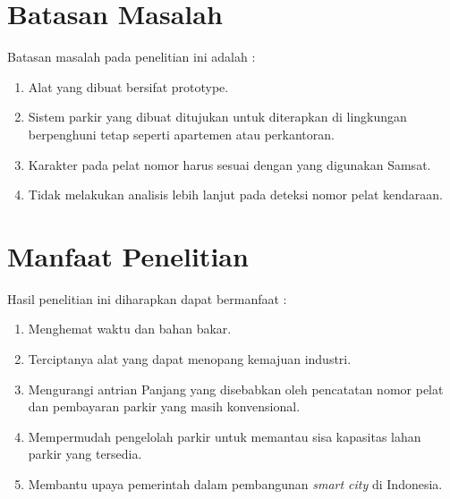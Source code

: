 \section{Batasan Masalah}
Batasan masalah pada penelitian ini adalah :
\begin{enumerate}[topsep=0pt,itemsep=0pt,partopsep=0pt, parsep=0pt]
    \item Alat yang dibuat bersifat prototype.
    \item Sistem parkir yang dibuat ditujukan untuk diterapkan di lingkungan berpenghuni tetap seperti apartemen atau perkantoran.
    \item Karakter pada pelat nomor harus sesuai dengan yang digunakan Samsat.
    \item Tidak melakukan analisis lebih lanjut pada deteksi nomor pelat kendaraan.
\end{enumerate}

\section{Manfaat Penelitian}
Hasil penelitian ini diharapkan dapat bermanfaat :
\begin{enumerate}[topsep=0pt,itemsep=0pt,partopsep=0pt, parsep=0pt]
    \item Menghemat waktu dan bahan bakar.
    \item Terciptanya alat yang dapat menopang kemajuan industri.
    \item Mengurangi antrian Panjang yang disebabkan oleh pencatatan nomor pelat dan pembayaran parkir yang masih konvensional.
    \item Mempermudah pengelolah parkir untuk memantau sisa kapasitas lahan parkir yang tersedia.
    \item Membantu upaya pemerintah dalam pembangunan \textit{smart city} di Indonesia.
\end{enumerate}

